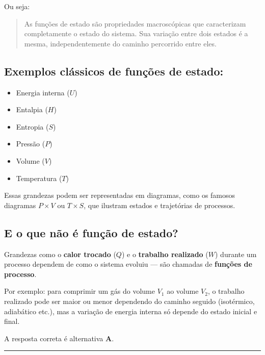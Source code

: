 \begin{flushleft}
Ou seja:
\begin{quote}
As funções de estado são propriedades macroscópicas que caracterizam completamente o estado do sistema. Sua variação entre dois estados é a mesma, independentemente do caminho percorrido entre eles.
\end{quote}

\subsection*{Exemplos clássicos de funções de estado:}
\begin{itemize}
    \item Energia interna (\(U\))
    \item Entalpia (\(H\))
    \item Entropia (\(S\))
    \item Pressão (\(P\))
    \item Volume (\(V\))
    \item Temperatura (\(T\))
\end{itemize}

Essas grandezas podem ser representadas em diagramas, como os famosos diagramas \(P \times V\) ou \(T \times S\), que ilustram estados e trajetórias de processos.

\subsection*{E o que não é função de estado?}

Grandezas como o \textbf{calor trocado} (\(Q\)) e o \textbf{trabalho realizado} (\(W\)) durante um processo dependem de 
como o sistema evoluiu — são chamadas de \textbf{funções de processo}.

Por exemplo: para comprimir um gás do volume \(V_1\) ao volume \(V_2\), o trabalho realizado pode ser maior ou menor 
dependendo do caminho seguido (isotérmico, adiabático etc.), mas a variação de energia interna só depende do estado inicial e final.

A resposta correta é alternativa \colorbox{green!50}{\textbf{A}}.
\end{flushleft}

\noindent\rule{\linewidth}{0.6pt}\\

